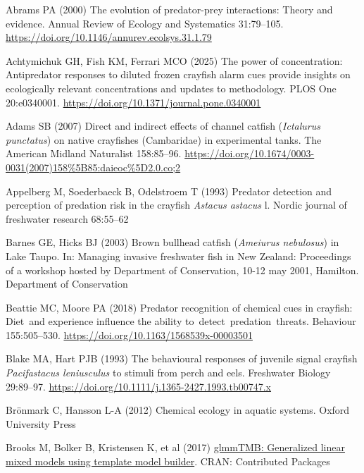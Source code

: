 \documentclass[
  letterpaper,
  DIV=11,
  numbers=noendperiod]{scrartcl}
\newlength{\cslhangindent}
\newenvironment{CSLReferences}[2] %
 {\begin{list}{}{%
  \setlength{\itemindent}{0pt}
  \setlength{\leftmargin}{0pt}
  \setlength{\parsep}{0pt}
  \ifodd #1
   \setlength{\leftmargin}{\cslhangindent}
   \setlength{\itemindent}{-1\cslhangindent}
  \fi
  \setlength{\itemsep}{#2\baselineskip}}}
 {\end{list}}
\begin{document}
\protect{}\label{refs}
\begin{CSLReferences}{1}{1}
Abrams PA (2000) The evolution of predator-prey interactions: Theory and
evidence. Annual Review of Ecology and Systematics 31:79--105.
\url{https://doi.org/10.1146/annurev.ecolsys.31.1.79}

Achtymichuk GH, Fish KM, Ferrari MCO (2025) The power of concentration:
Antipredator responses to diluted frozen crayfish alarm cues provide
insights on ecologically relevant concentrations and updates to
methodology. PLOS One 20:e0340001.
\url{https://doi.org/10.1371/journal.pone.0340001}

Adams SB (2007) Direct and indirect effects of channel catfish
({\emph{Ictalurus punctatus}}) on native crayfishes ({Cambaridae}) in
experimental tanks. The American Midland Naturalist 158:85--96.
\url{https://doi.org/10.1674/0003-0031(2007)158\%5B85:daieoc\%5D2.0.co;2}

Appelberg M, Soederbaeck B, Odelstroem T (1993) Predator detection and
perception of predation risk in the crayfish {\emph{Astacus astacus}} l.
Nordic journal of freshwater research 68:55--62

Barnes GE, Hicks BJ (2003) Brown bullhead catfish ({\emph{Ameiurus
nebulosus}}) in {Lake Taupo}. In: Managing invasive freshwater fish in
{New Zealand}: Proceedings of a workshop hosted by {Department of
Conservation}, 10-12 may 2001, {Hamilton}. Department of Conservation

Beattie MC, Moore PA (2018) Predator recognition of chemical cues in
crayfish: Diet~and experience influence the ability
to~detect~predation~threats. Behaviour 155:505--530.
\url{https://doi.org/10.1163/1568539x-00003501}

Blake MA, Hart PJB (1993) The behavioural responses of juvenile signal
crayfish {\emph{Pacifastacus leniusculus}} to stimuli from perch and
eels. Freshwater Biology 29:89--97.
\url{https://doi.org/10.1111/j.1365-2427.1993.tb00747.x}

Brönmark C, Hansson L-A (2012) Chemical ecology in aquatic systems.
Oxford University Press

Brooks M, Bolker B, Kristensen K, et al (2017)
\href{https://doi.org/10.32614/cran.package.glmmtmb}{glmmTMB:
Generalized linear mixed models using template model builder}. CRAN:
Contributed Packages


\end{CSLReferences}
\end{document}
